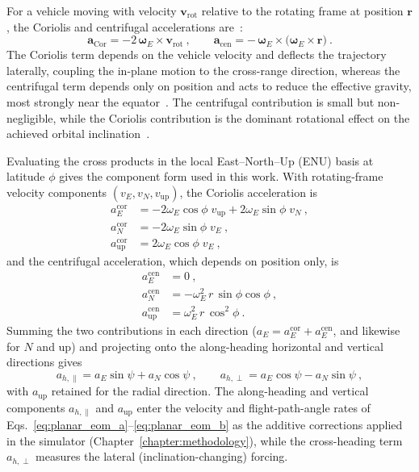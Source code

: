 For a vehicle moving with velocity $\mathbf{v}_{\mathrm{rot}}$ relative to the rotating frame at position $\mathbf{r}$, the Coriolis and centrifugal accelerations are~\cite{vallado2013fundamentals}:
\begin{equation}
\mathbf{a}_{\mathrm{Cor}} = -2\,\boldsymbol{\omega}_E\times\mathbf{v}_{\mathrm{rot}} \ ,
\qquad
\mathbf{a}_{\mathrm{cen}} = -\,\boldsymbol{\omega}_E\times\bigl(\boldsymbol{\omega}_E\times\mathbf{r}\bigr) \ .
\label{eq:pseudo_forces}
\end{equation}
The Coriolis term depends on the vehicle velocity and deflects the trajectory laterally, coupling the in-plane motion to the cross-range direction, whereas the centrifugal term depends only on position and acts to reduce the effective gravity, most strongly near the equator~\cite{curtis2020orbital}. The centrifugal contribution is small but non-negligible, while the Coriolis contribution is the dominant rotational effect on the achieved orbital inclination~\cite{vallado2013fundamentals}.

Evaluating the cross products in the local East--North--Up (ENU) basis at latitude $\phi$ gives the component form used in this work. With rotating-frame velocity components $(v_E,v_N,v_{\mathrm{up}})$, the Coriolis acceleration is~\cite{vallado2013fundamentals}
\begin{subequations}\label{eq:coriolis_enu}
\begin{align}
a_E^{\mathrm{cor}} &= -2\omega_E\cos\phi\;v_{\mathrm{up}} + 2\omega_E\sin\phi\;v_N \ , \\
a_N^{\mathrm{cor}} &= -2\omega_E\sin\phi\;v_E \ , \\
a_{\mathrm{up}}^{\mathrm{cor}} &= 2\omega_E\cos\phi\;v_E \ ,
\end{align}
\end{subequations}
and the centrifugal acceleration, which depends on position only, is~\cite{vallado2013fundamentals}
\begin{subequations}\label{eq:centrifugal_enu}
\begin{align}
a_E^{\mathrm{cen}} &= 0 \ , \\
a_N^{\mathrm{cen}} &= -\omega_E^{2}\,r\,\sin\phi\cos\phi \ , \\
a_{\mathrm{up}}^{\mathrm{cen}} &= \omega_E^{2}\,r\,\cos^{2}\!\phi \ .
\end{align}
\end{subequations}
Summing the two contributions in each direction ($a_E = a_E^{\mathrm{cor}}+a_E^{\mathrm{cen}}$, and likewise for $N$ and up) and projecting onto the along-heading horizontal and vertical directions gives
\begin{equation}
a_{h,\parallel} = a_E\sin\psi + a_N\cos\psi \ , \qquad
a_{h,\perp}     = a_E\cos\psi - a_N\sin\psi \ ,
\label{eq:pseudo_projection}
\end{equation}
with $a_{\mathrm{up}}$ retained for the radial direction. The along-heading and vertical components $a_{h,\parallel}$ and $a_{\mathrm{up}}$ enter the velocity and flight-path-angle rates of Eqs.~\eqref{eq:planar_eom_a}--\eqref{eq:planar_eom_b} as the additive corrections applied in the simulator (Chapter~\ref{chapter:methodology}), while the cross-heading term $a_{h,\perp}$ measures the lateral (inclination-changing) forcing.


